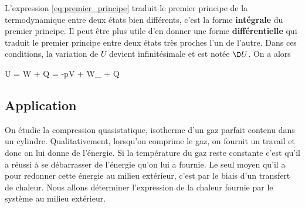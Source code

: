 \documentclass{cours}
\begin{document}
L'expression \eqref{eq:premier_principe} traduit le premier principe de la termodynamique entre deux états bien différents, c'est la forme \textbf{intégrale} du premier principe. Il peut être plus utile d'en donner une forme \textbf{différentielle} qui traduit le premier principe entre deux états très proches l'un de l'autre. Dans ces conditions, la variation de $U$ devient infinitésimale et est notée $\D U$. On a alors
\begin{eqencadre}
  \D U = \delta W + \delta Q = -p\D V + \delta W_ + \delta Q
\end{eqencadre}

\subsection{Application}%
\label{sub:application_premier_principe}

On étudie la compression quasistatique, isotherme d'un gaz parfait contenu dans un cylindre. Qualitativement, lorsqu'on comprime le gaz, on fournit un travail et donc on lui donne de l'énergie. Si la température du gaz reste constante c'est qu'il a réussi à se débarrasser de l'énergie qu'on lui a fournie. Le seul moyen qu'il a pour redonner cette énergie au milieu extérieur, c'est par le biais d'un transfert de chaleur. Nous allons déterminer l'expression de la chaleur fournie par le système au milieu extérieur.
\end{document}
